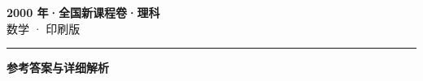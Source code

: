 \documentclass[zihao=5, a4paper]{ctexart}
\begin{document}
\begin{center}
  {\Large\bfseries 2000 年·全国新课程卷·理科}\\[4pt]
  {\large 数学 · 印刷版}
\end{center}
\medskip
{}

\par\bigskip\hrule\bigskip
{}
\begin{center}{\large\bfseries 参考答案与详细解析}\end{center}
\smallskip

\end{document}
